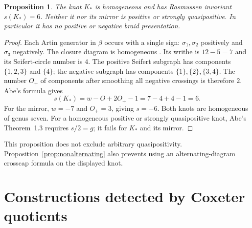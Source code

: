 \documentclass[11pt]{article}
\newtheorem{proposition}[theorem]{Proposition}
\begin{document}
\begin{proposition}\label{prop:rasmussen}
The knot $K_*$ is homogeneous and has Rasmussen invariant $s(K_*)=6$.
Neither it nor its mirror is positive or strongly quasipositive.
In particular it has no positive or negative braid presentation.
\end{proposition}
\begin{proof}
Each Artin generator in $\beta$ occurs with a single sign:
$\sigma_1,\sigma_2$ positively and $\sigma_3$ negatively.
The closure diagram is homogeneous
\cite[Lemma~2.2, p.~5]{abe}. Its writhe is $12-5=7$ and its
Seifert-circle number is $4$. The positive Seifert subgraph has
components $\{1,2,3\}$ and $\{4\}$; the negative subgraph has
components $\{1\},\{2\},\{3,4\}$.
The number $O_+$ of components after smoothing all negative
crossings is therefore $2$. Abe's formula
\cite[Theorem~1.2, p.~2]{abe} gives
\[
 s(K_*)=w-O+2O_+-1=7-4+4-1=6 .
\]
For the mirror, $w=-7$ and $O_+=3$, giving $s=-6$.
Both knots are homogeneous of genus seven.
For a homogeneous positive or strongly quasipositive knot,
Abe's Theorem~1.3 requires $s/2=g$; it fails for $K_*$ and its mirror.
\end{proof}

This proposition does not exclude arbitrary quasipositivity.
Proposition~\ref{prop:nonalternating} also prevents using an
alternating-diagram crosscap formula on the displayed knot.

\section{Constructions detected by Coxeter quotients}
\end{document}
